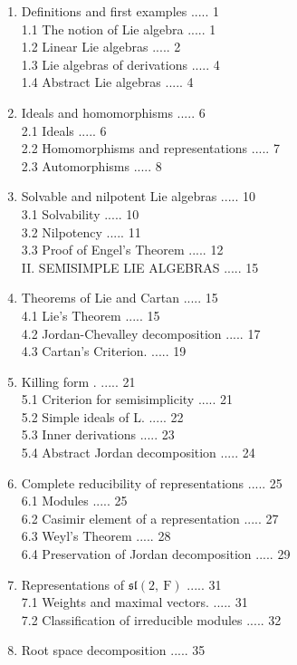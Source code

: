 \documentclass[10pt]{article}
\begin{document}
\begin{enumerate}
  \item Definitions and first examples ..... 1\\
1.1 The notion of Lie algebra ..... 1\\
1.2 Linear Lie algebras ..... 2\\
1.3 Lie algebras of derivations ..... 4\\
1.4 Abstract Lie algebras ..... 4
  \item Ideals and homomorphisms ..... 6\\
2.1 Ideals ..... 6\\
2.2 Homomorphisms and representations ..... 7\\
2.3 Automorphisms ..... 8
  \item Solvable and nilpotent Lie algebras ..... 10\\
3.1 Solvability ..... 10\\
3.2 Nilpotency ..... 11\\
3.3 Proof of Engel's Theorem ..... 12\\
II. SEMISIMPLE LIE ALGEBRAS ..... 15
  \item Theorems of Lie and Cartan ..... 15\\
4.1 Lie's Theorem ..... 15\\
4.2 Jordan-Chevalley decomposition ..... 17\\
4.3 Cartan's Criterion. ..... 19
  \item Killing form . ..... 21\\
5.1 Criterion for semisimplicity ..... 21\\
5.2 Simple ideals of L. ..... 22\\
5.3 Inner derivations ..... 23\\
5.4 Abstract Jordan decomposition ..... 24
  \item Complete reducibility of representations ..... 25\\
6.1 Modules ..... 25\\
6.2 Casimir element of a representation ..... 27\\
6.3 Weyl's Theorem ..... 28\\
6.4 Preservation of Jordan decomposition ..... 29
  \item Representations of $\mathfrak{s l}(2, \mathrm{~F})$ ..... 31\\
7.1 Weights and maximal vectors. ..... 31\\
7.2 Classification of irreducible modules ..... 32
  \item Root space decomposition ..... 35\\

\end{enumerate}
\end{document}
